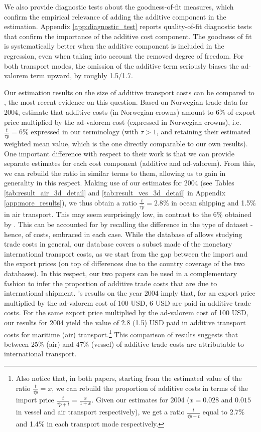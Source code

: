 \documentclass[a4paper,11pt]{article}
\begin{document}
We also provide diagnostic tests about the goodness-of-fit measures, which confirm the empirical relevance of adding the additive component in the estimation. Appendix \ref{app:diagnostic_test} reports quality-of-fit diagnostic tests that confirm the importance of the additive cost component.
The goodness of fit is systematically better when the additive component is included in the regression, even when taking into account the removed degree of freedom. For both transport modes, the omission of the additive term seriously biases the ad-valorem term upward, by roughly 1.5/1.7.\smallskip


Our estimation results on the size of additive transport costs can be compared to \cite{Irrazabal_2015}, the most recent evidence on this question.
Based on Norwegian trade data for 2004, \cite{Irrazabal_2015} estimate that additive costs (in Norwegian crowns) amount to 6\% of export price multiplied by the ad-valorem cost (expressed in Norwegian crowns), i.e.
$\frac{t}{\tau\widetilde{p}}=6\%$ expressed in our terminology (with $\tau>1$, and retaining their estimated weighted mean value, which is the one directly comparable to our own results).
One important difference with respect to their work is that we can provide separate estimates for each cost component (additive and ad-valorem).
From this, we can rebuild the ratio in similar terms to them, allowing us to gain in generality in this respect.
Making use of our estimates for 2004 (see Tables \ref{tab:result_air_3d_detail} and \ref{tab:result_ves_3d_detail} in Appendix \ref{app:more_results}), we thus obtain a ratio $\frac{t}{\tau\widetilde{p}}=2.8\%$ in ocean shipping and 1.5\% in air transport.
This may seem surprisingly low, in contrast to the 6\% obtained by \cite{Irrazabal_2015}.
This can be accounted for by recalling the difference in the type of dataset - hence, of costs, embraced in each case.
While the database of \cite{Irrazabal_2015} allows studying trade costs in general, our database covers a subset made of the monetary international transport costs, as we start from the gap between the import and the export prices (on top of differences due to the country coverage of the two databases).
In this respect, our two papers can be used in a complementary fashion to infer the proportion of additive trade costs that are due to international shipment.
\cite{Irrazabal_2015}'s results on the year 2004 imply that, for an export price multiplied by the ad-valorem cost of 100 USD, 6 USD are paid in additive trade costs.
For the same export price multiplied by the ad-valorem cost of 100 USD, our results for 2004 yield the value of 2.8 (1.5) USD paid in additive transport costs for maritime (air) transport.\footnote{Also notice that, in both papers, starting from the estimated value of the ratio $\frac{t}{\tau \widetilde{p}}= x$, we can rebuild the proportion of additive costs in terms of the import price $\frac{t}{\tau \widetilde{p} + t} = \frac{x}{1+x}$.
Given our estimates for 2004 ($x = 0.028$ and $0.015$ in vessel and air transport respectively), we get a ratio $\frac{t}{\tau \widetilde{p} + t}$ equal to 2.7\% and 1.4\% in each transport mode respectively.} This comparison of results suggests that between 25\% (air) and 47\% (vessel) of additive trade costs are attributable to international transport.
\end{document}
